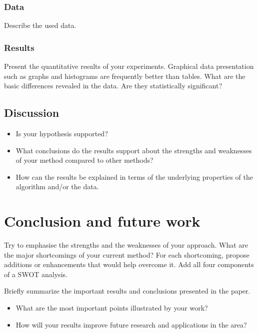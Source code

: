 \documentclass[runningheads,a4paper,11pt]{report}
\begin{document}
\subsection{Data}
\label{section:data}

Describe the used data.

\subsection{Results}
\label{section:results}

Present the quantitative results of your experiments. Graphical data presentation such as graphs and histograms are frequently better than tables. What are the basic differences revealed in the data. Are they statistically significant?

\section{Discussion}
\label{section:discussion}

\begin{itemize}
	\item Is your hypothesis supported? 
	\item What conclusions do the results support about the strengths and weaknesses of your method compared to other methods? 
	\item How can the results be explained in terms of the underlying properties of the algorithm and/or the data. 
\end{itemize}




\chapter{Conclusion and future work}
\label{chapter:concl}

Try to emphasise the strengths and the weaknesses of your approach.
What are the major shortcomings of your current method? For each shortcoming, propose additions or enhancements that would help overcome it. Add all four components of a SWOT analysis. 

Briefly summarize the important results and conclusions presented in the paper. 

\begin{itemize}
	\item What are the most important points illustrated by your work? 
	\item How will your results improve future research and applications in the area? 
\end{itemize}
\end{document}
